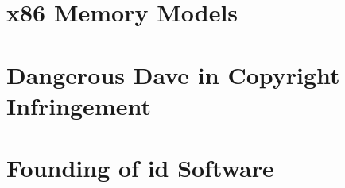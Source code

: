 \documentclass[8pt]{book}
\begin{document}
    \chapter{x86 Memory Models}
   		

	\chapter{Dangerous Dave in Copyright Infringement}
        
        
    \chapter{Founding of id Software}
        
        


  
    \cleartoleftpage
    \thispagestyle{plain} \blankpage
    \thispagestyle{plain} \blankpage
    \thispagestyle{plain} \blankpage
\end{document}
